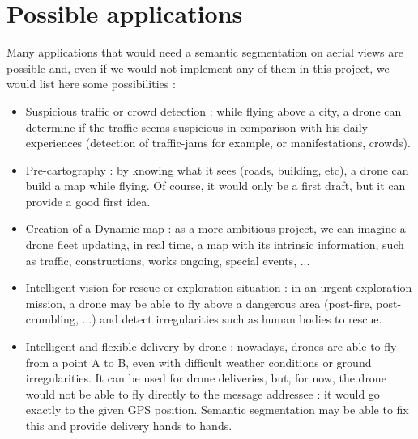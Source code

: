 \section{Possible applications}
Many applications that would need a semantic segmentation on aerial views are possible and, even if we would not implement any of them in this project, we would list here some possibilities :
\begin{itemize}
\item Suspicious traffic or crowd detection : while flying above a city, a drone can determine if the traffic seems suspicious in comparison with his daily experiences (detection of traffic-jams for example, or manifestations, crowds).
\item Pre-cartography : by knowing what it sees (roads, building, etc), a drone can build a map while flying. Of course, it would only be a first draft, but it can provide a good first idea.
\item Creation of a Dynamic map : as a more ambitious project, we can imagine a drone fleet updating, in real time, a map with its intrinsic information, such as traffic, constructions, works ongoing, special events, ...
\item Intelligent vision for rescue or exploration situation : in an urgent exploration mission, a drone may be able to fly above a dangerous area (post-fire, post-crumbling, ...) and detect irregularities such as human bodies to rescue.
\item Intelligent and flexible delivery by drone : nowadays, drones are able to fly from a point A to B, even with difficult weather conditions or ground irregularities. It can be used for drone deliveries, but, for now, the drone would not be able to fly directly to the message addressee : it would go exactly to the given GPS position. Semantic segmentation may be able to fix this and provide delivery hands to hands.
\end{itemize}



